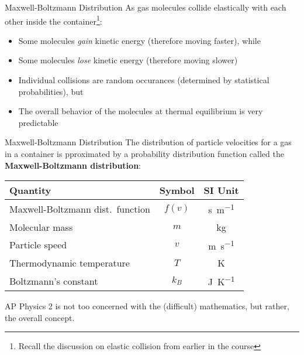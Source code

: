 \documentclass[12pt,aspectratio=169]{beamer}
\newcommand{\eq}[2]{
  \vspace{#1}{\Large
    \begin{displaymath}
      #2
    \end{displaymath}
  }
}
\begin{document}
\begin{frame}{Maxwell-Boltzmann Distribution}
  As gas molecules collide elastically with each other inside the
  container\footnote{Recall the discussion on elastic collision from earlier in
    the course}:
  \begin{itemize}
  \item Some molecules \emph{gain} kinetic energy (therefore moving faster),
    while
  \item Some molecules \emph{lose} kinetic energy (therefore moving slower)
  \item Individual collisions are random occurances (determined by statistical
    probabilities), but
  \item The overall behavior of the molecules at thermal equilibrium is very
    predictable
  \end{itemize}
\end{frame}



\begin{frame}{Maxwell-Boltzmann Distribution}
  The distribution of particle velocities for a gas in a container is
  pproximated by a probability distribution function called the
  \textbf{Maxwell-Boltzmann distribution}:

  \eq{-.2in}{
    f(v)=4\pi\left[\frac{m}{2\pi k_BT}\right]^{\frac32}v^2
    \exp\left[-\frac{mv^2}{2k_BT}\right]
  }

  \begin{center}
    \begin{tabular}{l|c|c}
      \rowcolor{pink}
      \textbf{Quantity} & \textbf{Symbol} & \textbf{SI Unit} \\ \hline
      Maxwell-Boltzmann dist.\ function & $f(v)$ &\si{\second\per\metre}\\
      Molecular mass            & $m$        & \si{\kilo\gram} \\
      Particle speed            & $v$        & \si{\metre\per\second} \\
      Thermodynamic temperature & $T$        & \si{\kelvin} \\
      Boltzmann's constant      & $k_B$      & \si{\joule\per\kelvin}
    \end{tabular}
  \end{center}
  AP Physics 2 is not too concerned with the (difficult) mathematics,
  but rather, the overall concept.
\end{frame}
\end{document}
